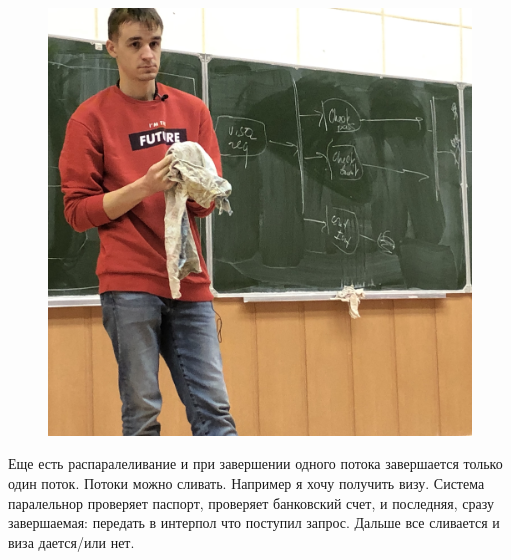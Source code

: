 \documentclass[12pt; a4paper]{book}
\begin{document}
\begin{figure}[!htbp]
\includegraphics[angle=0, width=\textwidth]{IMG/IMG_0826.jpg} \\
\end{figure}

Еще есть распаралеливание и при завершении одного потока завершается только один поток. Потоки можно сливать. 
Например я хочу получить визу. Система паралельнор проверяет паспорт, проверяет банковский счет, и последняя, сразу завершаемая: передать в интерпол что поступил запрос. Дальше все сливается и виза дается/или нет.\\
\newpage
\end{document}
